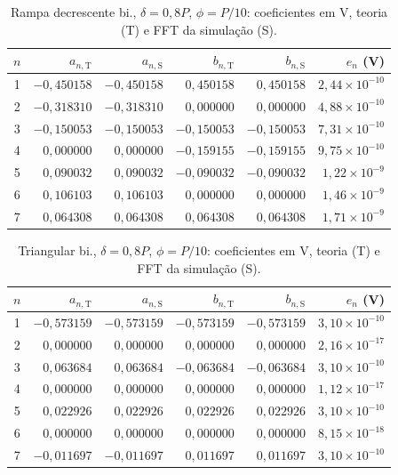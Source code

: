 \begin{table}[H]
\centering
\footnotesize\setlength{\tabcolsep}{2pt}
\caption{Rampa decrescente bi., $\delta=0{,}8P$, $\phi=P/10$: coeficientes em V, teoria (T) e FFT da simulação (S).}\label{tab:coef_comp17}
\begin{tabular}{crrrrr}\hline
$n$ & $a_{n,\mathrm T}$ & $a_{n,\mathrm S}$ & $b_{n,\mathrm T}$ & $b_{n,\mathrm S}$ & $e_n$ (V) \\ \hline
1 & $-0{,}450158$ & $-0{,}450158$ & $0{,}450158$ & $0{,}450158$ & $2{,}44\!\times\!10^{-10}$ \\
2 & $-0{,}318310$ & $-0{,}318310$ & $0{,}000000$ & $0{,}000000$ & $4{,}88\!\times\!10^{-10}$ \\
3 & $-0{,}150053$ & $-0{,}150053$ & $-0{,}150053$ & $-0{,}150053$ & $7{,}31\!\times\!10^{-10}$ \\
4 & $0{,}000000$ & $0{,}000000$ & $-0{,}159155$ & $-0{,}159155$ & $9{,}75\!\times\!10^{-10}$ \\
5 & $0{,}090032$ & $0{,}090032$ & $-0{,}090032$ & $-0{,}090032$ & $1{,}22\!\times\!10^{-9}$ \\
6 & $0{,}106103$ & $0{,}106103$ & $0{,}000000$ & $0{,}000000$ & $1{,}46\!\times\!10^{-9}$ \\
7 & $0{,}064308$ & $0{,}064308$ & $0{,}064308$ & $0{,}064308$ & $1{,}71\!\times\!10^{-9}$ \\
\hline\end{tabular}
\end{table}
\begin{table}[H]
\centering
\footnotesize\setlength{\tabcolsep}{2pt}
\caption{Triangular bi., $\delta=0{,}8P$, $\phi=P/10$: coeficientes em V, teoria (T) e FFT da simulação (S).}\label{tab:coef_comp18}
\begin{tabular}{crrrrr}\hline
$n$ & $a_{n,\mathrm T}$ & $a_{n,\mathrm S}$ & $b_{n,\mathrm T}$ & $b_{n,\mathrm S}$ & $e_n$ (V) \\ \hline
1 & $-0{,}573159$ & $-0{,}573159$ & $-0{,}573159$ & $-0{,}573159$ & $3{,}10\!\times\!10^{-10}$ \\
2 & $0{,}000000$ & $0{,}000000$ & $0{,}000000$ & $0{,}000000$ & $2{,}16\!\times\!10^{-17}$ \\
3 & $0{,}063684$ & $0{,}063684$ & $-0{,}063684$ & $-0{,}063684$ & $3{,}10\!\times\!10^{-10}$ \\
4 & $0{,}000000$ & $0{,}000000$ & $0{,}000000$ & $0{,}000000$ & $1{,}12\!\times\!10^{-17}$ \\
5 & $0{,}022926$ & $0{,}022926$ & $0{,}022926$ & $0{,}022926$ & $3{,}10\!\times\!10^{-10}$ \\
6 & $0{,}000000$ & $0{,}000000$ & $0{,}000000$ & $0{,}000000$ & $8{,}15\!\times\!10^{-18}$ \\
7 & $-0{,}011697$ & $-0{,}011697$ & $0{,}011697$ & $0{,}011697$ & $3{,}10\!\times\!10^{-10}$ \\
\hline\end{tabular}
\end{table}
